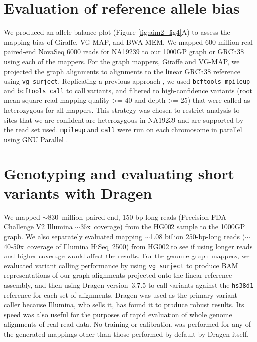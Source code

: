 \documentclass[11pt]{ucscthesis}
\begin{document}
\section{Evaluation of reference allele bias}
\label{subsec:aim2:srgiraffe_allelebias}
We produced an allele balance plot (Figure \ref{fig:aim2_fig4}A) to assess the mapping bias of Giraffe, VG-MAP, and BWA-MEM.
We mapped 600 million real paired-end NovaSeq 6000 reads for NA19239 to our 1000GP graph or GRCh38 using each of the mappers.
For the graph mappers, Giraffe and VG-MAP, we projected the graph alignments to alignments to the linear GRCh38 reference using \texttt{vg surject}.
Replicating a previous approach \cite{crysnanto_bovine_2020}, we used \texttt{bcftools mpileup} and \texttt{bcftools call}\cite{li_samtools_2011} to call variants, and filtered to high-confidence variants (root mean square read mapping quality >= 40 and depth >= 25) that were called as heterozygous for all mappers.
This strategy was chosen to restrict analysis to sites that we are confident are heterozygous in NA19239 and are supported by the read set used.
\texttt{mpileup} and \texttt{call} were run on each chromosome in parallel using GNU Parallel \cite{Tange2011a}.

\section{Genotyping and evaluating short variants with Dragen}
\label{subsec:aim2:dragen}

We mapped $\sim$830~million~paired-end, 150-bp-long reads (Precision FDA Challenge V2 Illumina $\sim$35x~coverage) from the HG002 sample to the 1000GP graph.
We also separately evaluated mapping $\sim$1.08 billion 250-bp-long reads ($\sim$40-50x~coverage of Illumina HiSeq~2500) from HG002 to see if using longer reads and higher coverage would affect the results.
For the genome graph mappers, we evaluated variant calling performance by using \texttt{vg~surject} to produce BAM representations of our graph alignments projected onto the linear reference assembly, and then using Dragen version~3.7.5 to call variants against the \texttt{hs38d1} reference for each set of alignments.
Dragen was used as the primary variant caller because Illumina, who sells it, has found it to produce robust results\cite{illumina_dragen_2019,illumina_dragen_pfda_2017,illumina_dragen_pfda_2020}.
Its speed was also useful for the purposes of rapid evaluation of whole genome alignments of real read data.
No training or calibration was performed for any of the generated mappings other than those performed by default by Dragen itself.
\end{document}
